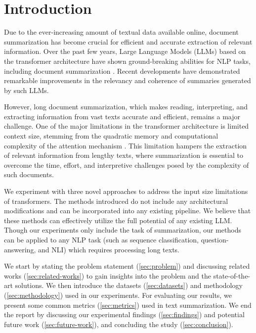 \section{Introduction}
\label{sec:introduction}

Due to the ever-increasing amount of textual data available online, document summarization has become crucial for efficient and accurate extraction of relevant information.
Over the past few years, Large Language Models (LLMs) based on the transformer architecture \cite{vaswani2017attention} have shown ground-breaking abilities for NLP tasks, including document summarization \cite{yadav2023state}.
Recent developments have demonstrated remarkable improvements in the relevancy and coherence of summaries generated by such LLMs.

However, long document summarization, which makes reading, interpreting, and extracting information from vast texts accurate and efficient, remains a major challenge.
One of the major limitations in the transformer architecture is limited context size, stemming from the quadratic memory and computational complexity of the attention mechanism \cite{du2023improving}.
This limitation hampers the extraction of relevant information from lengthy texts, where summarization is essential to overcome the time, effort, and interpretive challenges posed by the complexity of such documents.

We experiment with three novel approaches to address the input size limitations of transformers.
The methods introduced do not include any architectural modifications and can be incorporated into any existing pipeline.
We believe that these methods can effectively utilize the full potential of any existing LLM.
Though our experiments only include the task of summarization, our methods can be applied to any NLP task (such as sequence classification, question-answering, and NLI) which requires processing long texts.

We start by stating the problem statement (\autoref{sec:problem}) and discussing related works (\autoref{sec:related-works}) to gain insights into the problem and the state-of-the-art solutions.
We then introduce the datasets (\autoref{sec:datasets}) and methodology (\autoref{sec:methodology}) used in our experiments.
For evaluating our results, we present some common metrics (\autoref{sec:metrics}) used in text summarization.
We end the report by discussing our experimental findings (\autoref{sec:findings}) and potential future work (\autoref{sec:future-work}), and concluding the study (\autoref{sec:conclusion}).
